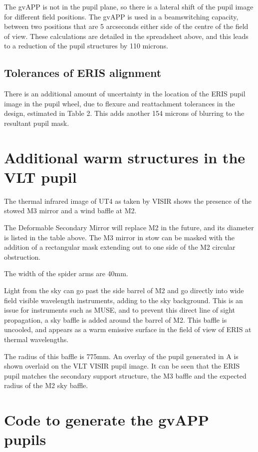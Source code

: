 \documentclass[a4paper,11pt]{article}
\begin{document}
The gvAPP is not in the pupil plane, so there is a lateral shift of the pupil image for different field positions. The gvAPP is used in a beamswitching capacity, between two positions that are 5 arcseconds either side of the centre of the field of view. These calculations are detailed in the spreadsheet above, and this leads to a reduction of the pupil structures by 110 microns.

\subsection{Tolerances of ERIS alignment}

There is an additional amount of uncertainty in the location of the ERIS pupil image in the pupil wheel, due to flexure and reattachment tolerances in the design, estimated in Table 2. This adds another 154 microns of blurring to the resultant pupil mask.


\section{Additional warm structures in the VLT pupil}

The thermal infrared image of UT4 as taken by VISIR shows the presence of the stowed M3 mirror and a wind baffle at M2.

The Deformable Secondary Mirror will replace M2 in the future, and its diameter is listed in the table above. The M3 mirror in stow can be masked with the addition of a rectangular mask extending out to one side of the M2 circular obstruction.

The width of the spider arms are 40mm.

Light from the sky can go past the side barrel of M2 and go directly into wide field visible wavelength instruments, adding to the sky background. This is an issue for instruments such as MUSE, and to prevent this direct line of sight propagation, a sky baffle is added around the barrel of M2. This baffle is uncooled, and appears as a warm emissive surface in the field of view of ERIS at thermal wavelengths.

The radius of this baffle is 775mm.
An overlay of the pupil generated in A is shown overlaid on the VLT VISIR pupil image. It can be seen that the ERIS pupil matches the secondary support structure, the M3 baffle and the expected radius of the M2 sky baffle.


\section{Code to generate the gvAPP pupils}
\end{document}
